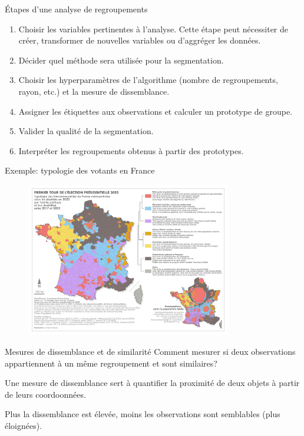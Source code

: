 \documentclass[
  ignorenonframetext,
]{beamer}
\providecommand{\tightlist}{%
  \setlength{\itemsep}{0pt}\setlength{\parskip}{0pt}}\usepackage{longtable,booktabs,array}
\begin{document}
\begin{frame}{Étapes d'une analyse de regroupements}
\protect\hypertarget{uxe9tapes-dune-analyse-de-regroupements}{}
\begin{enumerate}
\tightlist
\item
  Choisir les variables pertinentes à l'analyse. Cette étape peut
  nécessiter de créer, transformer de nouvelles variables ou d'aggréger
  les données.
\item
  Décider quel méthode sera utilisée pour la segmentation.
\item
  Choisir les hyperparamètres de l'algorithme (nombre de regroupements,
  rayon, etc.) et la mesure de dissemblance.
\item
  Assigner les étiquettes aux observations et calculer un prototype de
  groupe.
\item
  Valider la qualité de la segmentation.
\item
  Interpréter les regroupements obtenus à partir des prototypes.
\end{enumerate}
\end{frame}

\begin{frame}{Exemple: typologie des votants en France}
\protect\hypertarget{exemple-typologie-des-votants-en-france}{}
\begin{figure}

{\centering \includegraphics[width=0.8\textwidth,height=\textheight]{figures/typologie-vote-france.jpg}

}

\end{figure}
\end{frame}

\begin{frame}{Mesures de dissemblance et de similarité}
\protect\hypertarget{mesures-de-dissemblance-et-de-similarituxe9}{}
Comment mesurer si deux observations appartiennent à un même
regroupement et sont similaires?

Une mesure de dissemblance sert à quantifier la proximité de deux objets
à partir de leurs coordoonnées.

Plus la dissemblance est élevée, moins les observations sont semblables
(plus éloignées).
\end{frame}
\end{document}
